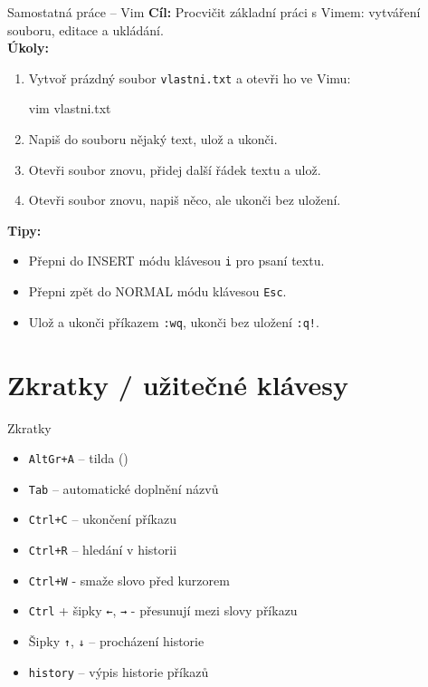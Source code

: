\documentclass{beamer}
\newcommand{\ts}{\raisebox{-0.25em}{\textasciitilde}}
\begin{document}
\begin{frame}{Samostatná práce – Vim}
\small
\textbf{Cíl:} Procvičit základní práci s Vimem: vytváření souboru, editace a ukládání.\\[0.5em]

\textbf{Úkoly:}
\begin{enumerate}
  \item Vytvoř prázdný soubor \texttt{vlastni.txt} a otevři ho ve Vimu:
  \begin{semiverbatim}
vim vlastni.txt
  \end{semiverbatim}
  \item Napiš do souboru nějaký text, ulož a ukonči.
  \item Otevři soubor znovu, přidej další řádek textu a ulož.
  \item Otevři soubor znovu, napiš něco, ale ukonči bez uložení.
\end{enumerate}

\textbf{Tipy:}
\begin{itemize}
  \item Přepni do INSERT módu klávesou \texttt{i} pro psaní textu.
  \item Přepni zpět do NORMAL módu klávesou \texttt{Esc}.
  \item Ulož a ukonči příkazem \texttt{:wq}, ukonči bez uložení \texttt{:q!}.
\end{itemize}
\end{frame}

  \section{Zkratky / užitečné klávesy}
  \begin{frame}{Zkratky}
    \begin{itemize}
      \item \texttt{AltGr+A} – tilda (\ts)
      \item \texttt{Tab} – automatické doplnění názvů
      \item \texttt{Ctrl+C} – ukončení příkazu
      \item \texttt{Ctrl+R} – hledání v historii
      \item \texttt{Ctrl+W} - smaže slovo před kurzorem
      \item \texttt{Ctrl} + šipky \texttt{←}, \texttt{→} - přesunují mezi slovy příkazu
      \item Šipky \texttt{↑}, \texttt{↓} – procházení historie
      \item \texttt{history} – výpis historie příkazů
    \end{itemize}
  \end{frame}
\end{document}
